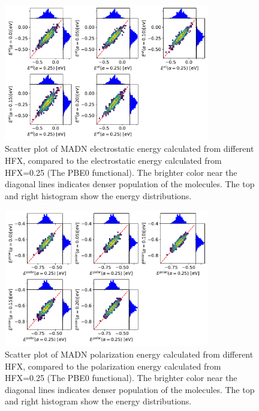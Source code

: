 \documentclass[%
 reprint,
 amsmath,amssymb,
 aps,
]{revtex4-2}
\begin{document}
\begin{figure}
  \centering
  \includegraphics[width=0.80\textwidth]{figs/scatterEstat_qmmm.pdf}
  \caption{Scatter plot of MADN electrostatic energy calculated from different HFX, compared to the electrostatic energy calculated from HFX=0.25 (The PBE0 functional). The brighter color near the diagonal lines indicates denser population of the molecules.  The top and right histogram show the energy distributions.}
  \label{fig:Estat_qmmm_MADN}
\end{figure}

\begin{figure}
  \centering
  \includegraphics[width=0.80\textwidth]{figs/scatterEdip_qmmm.pdf}
  \caption{Scatter plot of MADN polarization energy calculated from different HFX, compared to the polarization energy calculated from HFX=0.25 (The PBE0 functional). The brighter color near the diagonal lines indicates denser population of the molecules.  The top and right histogram show the energy distributions.}
  \label{fig:Edip_qmmm_MADN}
\end{figure}
\end{document}
